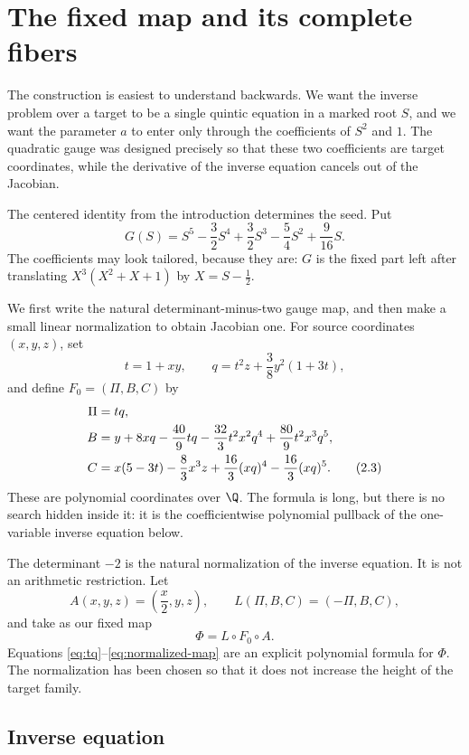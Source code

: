 \section{The fixed map and its complete fibers}\label{sec:fixed-map}

The construction is easiest to understand backwards.  We want the inverse
problem over a target to be a single quintic equation in a marked root
\(S\), and we want the parameter \(a\) to enter only through the
coefficients of \(S^2\) and \(1\).  The quadratic gauge was designed
precisely so that these two coefficients are target coordinates, while the
derivative of the inverse equation cancels out of the Jacobian.

The centered identity from the introduction determines the seed.  Put
\[
 G(S)=S^5-\frac32S^4+\frac32S^3-\frac54S^2+\frac9{16}S.
 \tag{2.1}\label{eq:seed}
\]
The coefficients may look tailored, because they are: \(G\) is the fixed
part left after translating \(X^3(X^2+X+1)\) by \(X=S-\tfrac12\).

We first write the natural determinant-minus-two gauge map, and then make a
small linear normalization to obtain Jacobian one.  For source coordinates
\((x,y,z)\), set
\[
 t=1+xy,\qquad
 q=t^2z+\frac38y^2(1+3t),
 \tag{2.2}\label{eq:tq}
\]
and define \(F_0=(\Pi,B,C)\) by
\begin{align}
 \Pi={}&tq,\notag\\
 B={}&y+8xq-\frac{40}{9}tq
       -\frac{32}{3}t^2x^2q^4
       +\frac{80}{9}t^2x^3q^5,\notag\\
 C={}&x(5-3t)-\frac83x^3z
       +\frac{16}{3}(xq)^4-\frac{16}{3}(xq)^5.
 \tag{2.3}\label{eq:base-map}
\end{align}
These are polynomial coordinates over \(\Q\).
The formula is long, but there is no search hidden inside it: it is the
coefficientwise polynomial pullback of the one-variable inverse equation
below.

The determinant \(-2\) is the natural normalization of the inverse
equation.  It is not an arithmetic restriction.  Let
\[
 A(x,y,z)=\left(\frac{x}{2},y,z\right),
 \qquad
 L(\Pi,B,C)=(-\Pi,B,C),
 \tag{2.4}\label{eq:linear-normalization}
\]
and take as our fixed map
\[
 \boxed{\Phi=L\circ F_0\circ A.}
 \tag{2.5}\label{eq:normalized-map}
\]
Equations \eqref{eq:tq}--\eqref{eq:normalized-map} are an explicit polynomial formula for
\(\Phi\).  The normalization has been chosen so that it does not increase
the height of the target family.

\subsection{Inverse equation}

